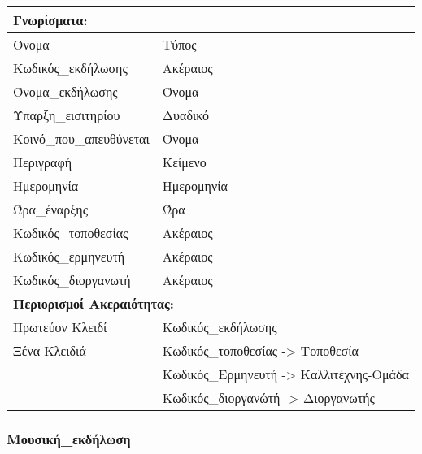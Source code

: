 \begin{tabular}{|p{6cm}|p{8cm}|}
  \multicolumn{2}{l}{\textbf{Γνωρίσματα:}}                          \\ \hline
  Όνομα                   & Τύπος                                   \\ \hline
  Κωδικός\_εκδήλωσης      & Ακέραιος                                \\ \hline
  Όνομα\_εκδήλωσης        & Όνομα                                   \\ \hline
  Ύπαρξη\_εισιτηρίου      & Δυαδικό                                 \\ \hline
  Κοινό\_που\_απευθύνεται & Όνομα                                   \\ \hline
  Περιγραφή               & Κείμενο                                 \\ \hline
  Ημερομηνία              & Ημερομηνία                              \\ \hline
  Ώρα\_έναρξης            & Ώρα                                     \\ \hline
  Κωδικός\_τοποθεσίας     & Ακέραιος                                \\ \hline
  Κωδικός\_ερμηνευτή      & Ακέραιος                                \\ \hline
  Κωδικός\_διοργανωτή     & Ακέραιος                                \\ \hline
  \multicolumn{2}{l}{\textbf{Περιορισμοί Ακεραιότητας:}}            \\ \hline
  Πρωτεύον Κλειδί         & Κωδικός\_εκδήλωσης                      \\ \hline
  Ξένα Κλειδιά            & Κωδικός\_τοποθεσίας -> Τοποθεσία        \\ \cline{2-2}
                          & Κωδικός\_Ερμηνευτή -> Καλλιτέχνης-Ομάδα \\ \cline{2-2}
                          & Κωδικός\_διοργανώτή -> Διοργανωτής      \\ \hline
\end{tabular}

\subsubsection*{Μουσική\_εκδήλωση}

